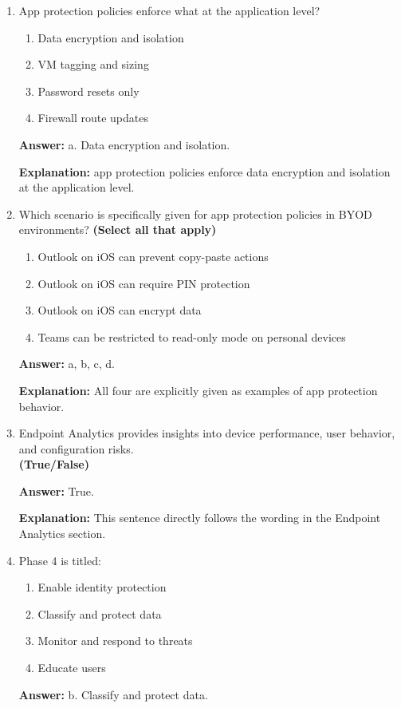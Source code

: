 \documentclass[10pt]{article}
\begin{document}
\begin{enumerate}[leftmargin=*]
\textbf{Explanation:} This scenario follows the exact example used in the endpoint compliance policies section.

\item App protection policies enforce what at the application level?
\begin{enumerate}[label=\alph*., leftmargin=1.5em]
\item Data encryption and isolation
\item VM tagging and sizing
\item Password resets only
\item Firewall route updates
\end{enumerate}
\textbf{Answer:} a. Data encryption and isolation.

\textbf{Explanation:} app protection policies enforce data encryption and isolation at the application level.

\item Which scenario is specifically given for app protection policies in BYOD environments? \textbf{(Select all that apply)}
\begin{enumerate}[label=\alph*., leftmargin=1.5em]
\item Outlook on iOS can prevent copy-paste actions
\item Outlook on iOS can require PIN protection
\item Outlook on iOS can encrypt data
\item Teams can be restricted to read-only mode on personal devices
\end{enumerate}
\textbf{Answer:} a, b, c, d.

\textbf{Explanation:} All four are explicitly given as examples of app protection behavior.

\item Endpoint Analytics provides insights into device performance, user behavior, and configuration risks.\\
\textbf{(True/False)}

\textbf{Answer:} True.

\textbf{Explanation:} This sentence directly follows the wording in the Endpoint Analytics section.

\item Phase 4 is titled:
\begin{enumerate}[label=\alph*., leftmargin=1.5em]
\item Enable identity protection
\item Classify and protect data
\item Monitor and respond to threats
\item Educate users
\end{enumerate}
\textbf{Answer:} b. Classify and protect data.


\end{enumerate}
\end{document}
